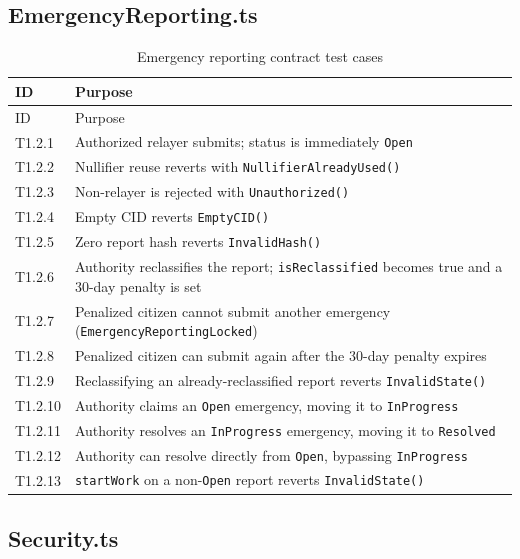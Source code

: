 \subsection{EmergencyReporting.ts}

\begin{longtable}{p{}|p{}}
\caption{Emergency reporting contract test cases} \\

  {ID} &   {Purpose} \\
\hline
\endfirsthead
\hline
  {ID} &   {Purpose} \\
\hline
\endhead
T1.2.1 & Authorized relayer submits; status is immediately \texttt{Open} \\
\hline
T1.2.2 & Nullifier reuse reverts with \texttt{NullifierAlreadyUsed()} \\
\hline
T1.2.3 & Non-relayer is rejected with \texttt{Unauthorized()} \\
\hline
T1.2.4 & Empty CID reverts \texttt{EmptyCID()} \\
\hline
T1.2.5 & Zero report hash reverts \texttt{InvalidHash()} \\
\hline
T1.2.6 & Authority reclassifies the report; \texttt{isReclassified} becomes true and a 30-day penalty is set \\
\hline
T1.2.7 & Penalized citizen cannot submit another emergency (\texttt{EmergencyReportingLocked}) \\
\hline
T1.2.8 & Penalized citizen can submit again after the 30-day penalty expires \\
\hline
T1.2.9 & Reclassifying an already-reclassified report reverts \texttt{InvalidState()} \\
\hline
T1.2.10 & Authority claims an \texttt{Open} emergency, moving it to \texttt{InProgress} \\
\hline
T1.2.11 & Authority resolves an \texttt{InProgress} emergency, moving it to \texttt{Resolved} \\
\hline
T1.2.12 & Authority can resolve directly from \texttt{Open}, bypassing \texttt{InProgress} \\
\hline
T1.2.13 & \texttt{startWork} on a non-\texttt{Open} report reverts \texttt{InvalidState()} \\

\end{longtable}

\subsection{Security.ts}
\label{apndx:security-test-cases}


